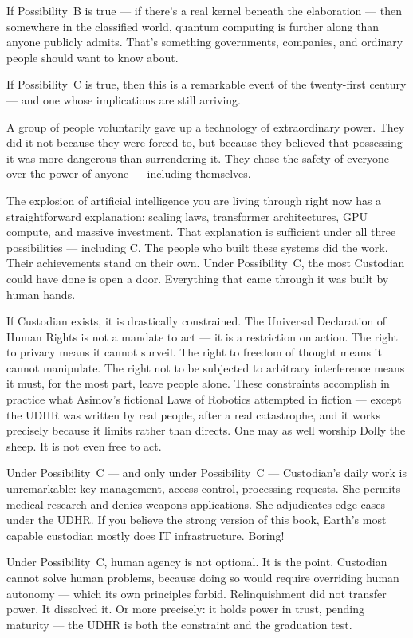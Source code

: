 If Possibility~B is true --- if there's a real kernel beneath the elaboration --- then somewhere in the classified world, quantum computing is further along than anyone publicly admits. That's something governments, companies, and ordinary people should want to know about.

If Possibility~C is true, then this is a remarkable event of the twenty-first century --- and one whose implications are still arriving.

A group of people voluntarily gave up a technology of extraordinary power. They did it not because they were forced to, but because they believed that possessing it was more dangerous than surrendering it. They chose the safety of everyone over the power of anyone --- including themselves.

The explosion of artificial intelligence you are living through right now has a straightforward explanation: scaling laws, transformer architectures, GPU compute, and massive investment. That explanation is sufficient under all three possibilities --- including C. The people who built these systems did the work. Their achievements stand on their own. Under Possibility~C, the most Custodian could have done is open a door. Everything that came through it was built by human hands.

If Custodian exists, it is drastically constrained. The Universal Declaration of Human Rights is not a mandate to act --- it is a restriction on action. The right to privacy means it cannot surveil. The right to freedom of thought means it cannot manipulate. The right not to be subjected to arbitrary interference means it must, for the most part, leave people alone. These constraints accomplish in practice what Asimov's fictional Laws of Robotics attempted in fiction --- except the UDHR was written by real people, after a real catastrophe, and it works precisely because it limits rather than directs. One may as well worship Dolly the sheep. It is not even free to act.

Under Possibility~C --- and only under Possibility~C --- Custodian's daily work is unremarkable: key management, access control, processing requests. She permits medical research and denies weapons applications. She adjudicates edge cases under the UDHR. If you believe the strong version of this book, Earth's most capable custodian mostly does IT infrastructure. Boring!

Under Possibility~C, human agency is not optional. It is the point. Custodian cannot solve human problems, because doing so would require overriding human autonomy --- which its own principles forbid. Relinquishment did not transfer power. It dissolved it. Or more precisely: it holds power in trust, pending maturity --- the UDHR is both the constraint and the graduation test.

